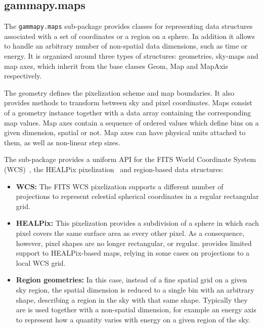 \subsection{gammapy.maps}
\label{ssec:gammapy-maps}
The \verb|gammapy.maps| sub-package provides classes for representing data structures associated with a set of coordinates or a region on a sphere. In addition it allows to handle an arbitrary number of non-spatial data dimensions, such as time or energy. It is organized around three types of structures: geometries, sky-maps and map axes, which inherit from the base classes Geom, Map and MapAxis respectively. 

The geometry defines the pixelization scheme and map boundaries. It also provides methods to transform between sky and pixel coordinates. Maps consist of a geometry instance together with a data array containing the corresponding map values. Map axes contain a sequence of ordered values which define bins on a given dimension, spatial or not. Map axes can have physical units attached to them, as well as non-linear step sizes.

The sub-package provides a uniform API for the FITS World Coordinate System (WCS)~\citep{Calabretta2002}, the HEALPix pixelization~\citep{Gorski2005} and region-based data structures:

\begin{itemize}
	\item \textbf{WCS: } The FITS WCS pixelization supports a different number of projections to represent celestial spherical coordinates in a regular rectangular grid.
	\item \textbf{HEALPix: } This pixelization provides a subdivision of a sphere in which each pixel covers the same surface area as every other pixel. As a consequence, however, pixel shapes are no longer rectangular, or regular. \gammapy provides limited support to HEALPix-based maps, relying in some cases on projections to a local WCS grid.
	\item \textbf{Region geometries: } In this case, instead of a fine spatial grid on a given sky region, the spatial dimension is reduced to a single bin with an arbitrary shape, describing a region in the sky with that same shape. Typically they are is used together with a non-spatial dimension, for example an energy axis to represent how a quantity varies with energy on a given region of the sky.
\end{itemize}



